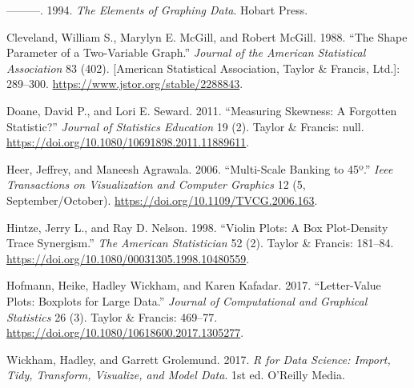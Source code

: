 \documentclass[]{book}
\theoremstyle{plain}
\theoremstyle{remark}
\begin{document}
\leavevmode\hypertarget{ref-Cleveland1994}{}%
---------. 1994. \emph{The Elements of Graphing Data}. Hobart Press.

\leavevmode\hypertarget{ref-ClevelandMcGillMcGill1988}{}%
Cleveland, William S., Marylyn E. McGill, and Robert McGill. 1988. ``The
Shape Parameter of a Two-Variable Graph.'' \emph{Journal of the American
Statistical Association} 83 (402). {[}American Statistical Association,
Taylor \& Francis, Ltd.{]}: 289--300.
\url{https://www.jstor.org/stable/2288843}.

\leavevmode\hypertarget{ref-DoaneSeward2011}{}%
Doane, David P., and Lori E. Seward. 2011. ``Measuring Skewness: A
Forgotten Statistic?'' \emph{Journal of Statistics Education} 19 (2).
Taylor \& Francis: null.
\url{https://doi.org/10.1080/10691898.2011.11889611}.

\leavevmode\hypertarget{ref-HeerAgrawala2006}{}%
Heer, Jeffrey, and Maneesh Agrawala. 2006. ``Multi-Scale Banking to
45º.'' \emph{Ieee Transactions on Visualization and Computer Graphics}
12 (5, September/October). \url{https://doi.org/10.1109/TVCG.2006.163}.

\leavevmode\hypertarget{ref-HintzeNelson1998}{}%
Hintze, Jerry L., and Ray D. Nelson. 1998. ``Violin Plots: A Box
Plot-Density Trace Synergism.'' \emph{The American Statistician} 52 (2).
Taylor \& Francis: 181--84.
\url{https://doi.org/10.1080/00031305.1998.10480559}.

\leavevmode\hypertarget{ref-HofmannWickhamKafadar2017}{}%
Hofmann, Heike, Hadley Wickham, and Karen Kafadar. 2017. ``Letter-Value
Plots: Boxplots for Large Data.'' \emph{Journal of Computational and
Graphical Statistics} 26 (3). Taylor \& Francis: 469--77.
\url{https://doi.org/10.1080/10618600.2017.1305277}.

\leavevmode\hypertarget{ref-WickhamGrolemund2017}{}%
Wickham, Hadley, and Garrett Grolemund. 2017. \emph{R for Data Science:
Import, Tidy, Transform, Visualize, and Model Data}. 1st ed. O'Reilly
Media.
\end{document}
